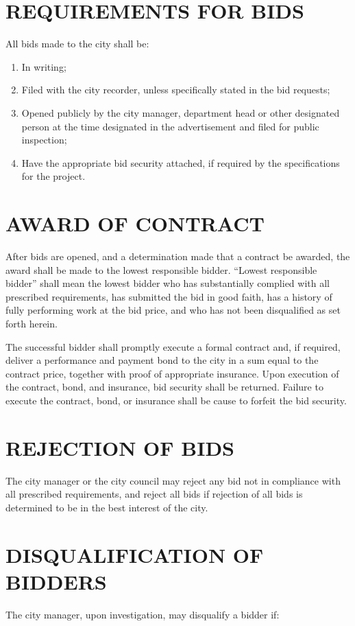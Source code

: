 \pagebreak

\section{REQUIREMENTS FOR BIDS}
All bids made to the city shall be:

\begin{enumerate}
	\item In writing; 
	\item Filed with the city recorder, unless specifically stated in the bid requests; 
	\item Opened publicly by the city manager, department head or other designated person at the time designated in the advertisement and filed for public inspection; 
	\item Have the appropriate bid security attached, if required by the specifications for the project. 
\end{enumerate}

\section{AWARD OF CONTRACT}
After bids are opened, and a determination made that a contract be awarded, the award shall be made to the lowest responsible bidder. “Lowest responsible bidder” shall mean the lowest bidder who has substantially complied with all prescribed requirements, has submitted the bid in good faith, has a history of fully performing work at the bid price, and who has not been disqualified as set forth herein. 

The successful bidder shall promptly execute a formal contract and, if required, deliver a performance and payment bond to the city in a sum equal to the contract price, together with proof of appropriate insurance. Upon execution of the contract, bond, and insurance, bid security shall be returned. Failure to execute the contract, bond, or insurance shall be cause to forfeit the bid security. 

\section{REJECTION OF BIDS}
The city manager or the city council may reject any bid not in compliance with all prescribed requirements, and reject all bids if rejection of all bids is determined to be in the best interest of the city. 

\section{DISQUALIFICATION OF BIDDERS}
The city manager, upon investigation, may disqualify a bidder if: 

